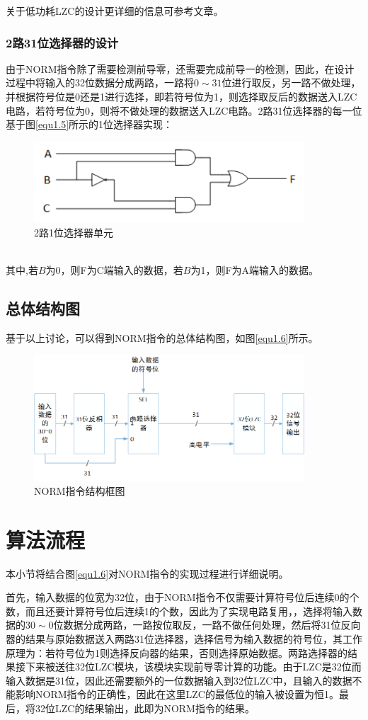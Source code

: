 关于低功耗LZC的设计更详细的信息可参考文章\cite{dimitrakopoulos2008low}。
\subsubsection{2路31位选择器的设计}
由于NORM指令除了需要检测前导零，还需要完成前导一的检测，因此，在设计过程中将输入的32位数据分成两路，一路将$0 \sim 31$位进行取反，另一路不做处理，并根据符号位是0还是1进行选择，即若符号位为1，则选择取反后的数据送入LZC电路，若符号位为0，则将不做处理的数据送入LZC电路。2路31位选择器的每一位基于图\ref{equ1.5}所示的1位选择器实现：
\begin{figure}[!hbtp]
\centering
\includegraphics[width=0.9\textwidth]{chapter1/MUX2_1}
\caption{2路1位选择器单元}
\label{fig1.5}
\end{figure}\\
\noindent 其中,若$B$为0，则F为C端输入的数据，若$B$为1，则F为A端输入的数据。
\subsection{总体结构图}
基于以上讨论，可以得到NORM指令的总体结构图，如图\ref{equ1.6}所示。
\begin{figure}[!hbtp]
\centering
\includegraphics[width=0.9\textwidth]{chapter1/NORM}
\caption{NORM指令结构框图}
\label{fig1.6}
\end{figure}
\section{算法流程}
本小节将结合图\ref{equ1.6}对NORM指令的实现过程进行详细说明。

首先，输入数据的位宽为32位，由于NORM指令不仅需要计算符号位后连续0的个数，而且还要计算符号位后连续1的个数，因此为了实现电路复用，，选择将输入数据的$30 \sim 0$位数据分成两路，一路按位取反，一路不做任何处理，然后将31位反向器的结果与原始数据送入两路31位选择器，选择信号为输入数据的符号位，其工作原理为：若符号位为1则选择反向器的结果，否则选择原始数据。两路选择器的结果接下来被送往32位LZC模块，该模块实现前导零计算的功能。由于LZC是32位而输入数据是31位，因此还需要额外的一位数据输入到32位LZC中，且输入的数据不能影响NORM指令的正确性，因此在这里LZC的最低位的输入被设置为恒1。最后，将32位LZC的结果输出，此即为NORM指令的结果。
